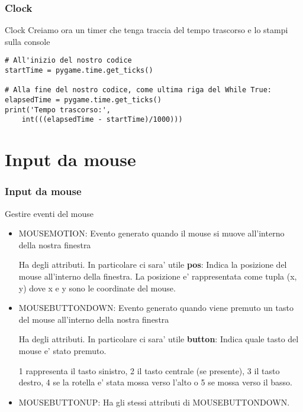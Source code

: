 \documentclass{beamer}
\begin{document}
\begin{frame}[fragile]
\frametitle{Clock}

\begin{block}{Clock}
Creiamo ora un timer che tenga traccia del tempo trascorso e lo stampi sulla console
\end{block}

\begin{lstlisting}
# All'inizio del nostro codice
startTime = pygame.time.get_ticks()

# Alla fine del nostro codice, come ultima riga del While True:
elapsedTime = pygame.time.get_ticks()
print('Tempo trascorso:',
    int(((elapsedTime - startTime)/1000)))
\end{lstlisting}
\end{frame}


\section{Input da mouse}

\begin{frame}[fragile]
\frametitle{Input da mouse}
    
    \begin{block}{Gestire eventi del mouse}
        \begin{itemize}
            \item MOUSEMOTION: Evento generato quando il mouse si muove all'interno della nostra finestra
            
            Ha degli attributi. In particolare ci sara' utile \textbf{pos}: Indica la posizione del mouse all'interno della finestra. La posizione e' rappresentata come tupla (x, y) dove x e y sono le coordinate del mouse.
            \item MOUSEBUTTONDOWN: Evento generato quando viene premuto un tasto del mouse all'interno della nostra finestra
            
            Ha degli attributi. In particolare ci sara' utile \textbf{button}: Indica quale tasto del mouse e' stato premuto.
            
            1 rappresenta il tasto sinistro, 2 il tasto centrale (se presente), 3 il tasto destro, 4 se la rotella e' stata mossa verso l'alto o 5 se mossa verso il basso.
            
            \item MOUSEBUTTONUP: Ha gli stessi attributi di MOUSEBUTTONDOWN.
        \end{itemize}
    \end{block}
    
\end{frame}
\end{document}
